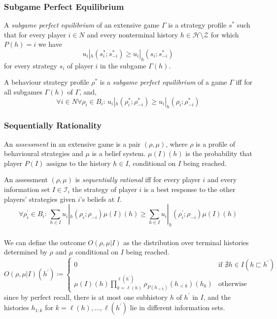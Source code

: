 \documentclass[UTF8,11pt,colorlinks,compress,openany]{beamer}%
\begin{document}
\begin{frame}\frametitle{Subgame Perfect Equilibrium}
\begin{definition}
	A \emph{subgame perfect equilibrium} of an extensive game $\Gamma$ is a strategy profile $s^*$ such that for every player $i\in N$ and every nonterminal history $h\in\mathcal{H}\setminus\mathcal{Z}$ for which $P(h)=i$ we have \[u_i|_h(s_i^*;s_{-i}^*)\geq u_i|_h(s_i;s_{-i}^*)\]
	for every strategy $s_i$ of player $i$ in the subgame $\Gamma(h)$.
	
	A behaviour strategy profile $\rho^*$ is a \emph{subgame perfect equilibrium} of a game $\Gamma$ iff for all subgames $\Gamma(h)$ of $\Gamma$, and,
	\[\forall i\in N\forall\rho_i\in B_i:\, u_i|_h(\rho_i^*;\rho_{-i}^*)\geq u_i|_h(\rho_i;\rho_{-i}^*)\]
\end{definition}
\end{frame}

\begin{frame}\frametitle{Sequentially Rationality}
\begin{definition}[Assessment]
	An \emph{assessment} in an extensive game is a pair $(\rho,\mu)$, where $\rho$ is a profile of behavioural strategies and $\mu$ is a belief system. $\mu(I)(h)$ is the probability that player $P(I)$ assigns to the history $h\in I$, conditional on $I$ being reached.
\end{definition}
\begin{definition}
	An assessment $(\rho,\mu)$ is \emph{sequentially rational} iff for every player $i$ and every information set $I\in\mathcal{I}_i$ the strategy of player $i$ is a best response to the other players' strategies given $i$'s beliefs at $I$.
	\[\forall\rho_i^\prime\in B_i:\, \sum\limits_{h\in I}u_i|_h(\rho_i;\rho_{-i})\mu(I)(h)\geq\sum\limits_{h\in I}u_i|_h(\rho_i^\prime;\rho_{-i})\mu(I)(h)\]
\end{definition}
\end{frame}

\begin{frame}\frametitle{}
We can define the outcome $O(\rho,\mu|I)$ as the distribution over terminal histories determined by $\rho$ and $\mu$ conditional on $I$ being reached.
\[
O(\rho,\mu|I)(h^\prime)\coloneqq 
\begin{cases}
0 &\text{if $\nexists h\in I\left(h\sqsubset h^\prime\right)$}\\
\mu(I)(h)\prod\limits_{k=\ell(h)}^{\ell(h^\prime)}\rho_{P(h_{<k})}(h_{<k})(h_k) &\text{otherwise}
\end{cases}
\]
since by perfect recall, there is at most one subhistory $h$ of $h^\prime$ in $I$, and the histories $h_{1:k}$ for $k=\ell(h),\ldots,\ell(h^\prime)$ lie in different information sets.
\end{frame}
\end{document}
